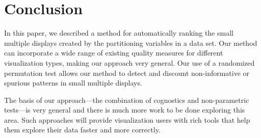 \section{Conclusion}

In this paper, we described a method for automatically ranking the small multiple displays created by the partitioning variables in a data set. Our method can incorporate a wide range of existing quality measures for different visualization types, making our approach very general. Our use of a randomized permutation test allows our method to detect and discount non-informative or spurious patterns in small multiple displays.

The basis of our approach---the combination of cognostics and non-parametric tests---is very general and there is much more work to be done exploring this area. Such approaches will provide visualization users with rich tools that help them explore their data faster and more correctly.
